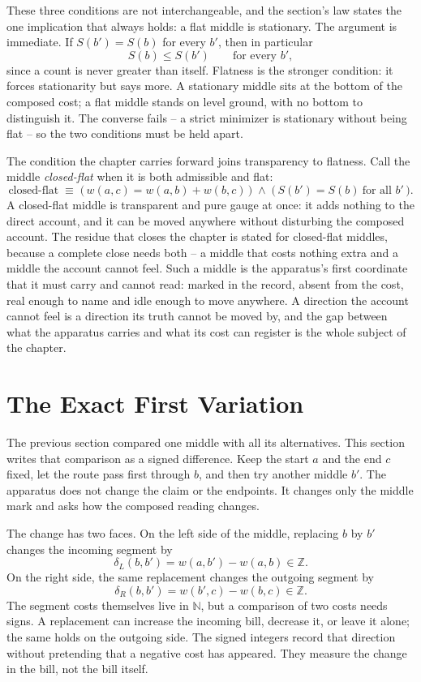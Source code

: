 These three conditions are not interchangeable, and the section's law states the one implication that always holds: a flat middle is stationary. The argument is immediate. If $S(b') = S(b)$ for every $b'$, then in particular
\[
  S(b) \le S(b') \qquad \text{for every } b',
\]
since a count is never greater than itself. Flatness is the stronger condition: it forces stationarity but says more. A stationary middle sits at the bottom of the composed cost; a flat middle stands on level ground, with no bottom to distinguish it. The converse fails -- a strict minimizer is stationary without being flat -- so the two conditions must be held apart.

The condition the chapter carries forward joins transparency to flatness. Call the middle \emph{closed-flat} when it is both admissible and flat:
\[
  \text{closed-flat}
  \;\equiv\;
  \bigl(\, w(a,c) = w(a,b) + w(b,c) \,\bigr)
  \;\wedge\;
  \bigl(\, S(b') = S(b) \ \text{for all } b' \,\bigr).
\]
A closed-flat middle is transparent and pure gauge at once: it adds nothing to the direct account, and it can be moved anywhere without disturbing the composed account. The residue that closes the chapter is stated for closed-flat middles, because a complete close needs both -- a middle that costs nothing extra and a middle the account cannot feel. Such a middle is the apparatus's first coordinate that it must carry and cannot read: marked in the record, absent from the cost, real enough to name and idle enough to move anywhere. A direction the account cannot feel is a direction its truth cannot be moved by, and the gap between what the apparatus carries and what its cost can register is the whole subject of the chapter.

\section{The Exact First Variation}

The previous section compared one middle with all its alternatives. This section writes that comparison as a signed difference. Keep the start $a$ and the end $c$ fixed, let the route pass first through $b$, and then try another middle $b'$. The apparatus does not change the claim or the endpoints. It changes only the middle mark and asks how the composed reading changes.

The change has two faces. On the left side of the middle, replacing $b$ by $b'$ changes the incoming segment by
\[
  \delta_L(b,b') = w(a,b') - w(a,b) \in \mathbb{Z}.
\]
On the right side, the same replacement changes the outgoing segment by
\[
  \delta_R(b,b') = w(b',c) - w(b,c) \in \mathbb{Z}.
\]
The segment costs themselves live in $\mathbb{N}$, but a comparison of two costs needs signs. A replacement can increase the incoming bill, decrease it, or leave it alone; the same holds on the outgoing side. The signed integers record that direction without pretending that a negative cost has appeared. They measure the change in the bill, not the bill itself.

